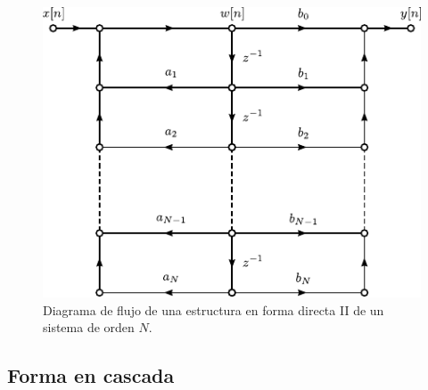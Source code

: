 \documentclass[a4paper]{report}
\begin{document}
\begin{figure}[!htb]
 \begin{minipage}[c]{0.64\textwidth}
  \includegraphics[width=\textwidth]{figuras/structures_flow_graph_direct_form_II.pdf}
 \end{minipage}\hfill
 \begin{minipage}[c]{0.26\textwidth}
  \caption{
   Diagrama de flujo de una estructura en forma directa II de un sistema de orden \(N\).
   }\label{fig:structures_flow_graph_direct_form_II}
 \end{minipage}
\end{figure} 

\subsection{Forma en cascada}
\end{document}
